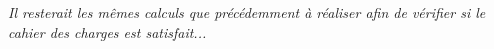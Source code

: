 \documentclass[10pt,fleqn]{article} %
\begin{document}
\ifprof
\begin{corrige}
\end{corrige}
\else
\fi

\vspace{1cm}

\textit{Il resterait les mêmes calculs que précédemment à réaliser afin de vérifier si le cahier des charges est satisfait...}
%


%

%
%
%

%
%
\end{document}
